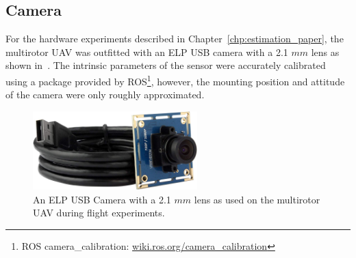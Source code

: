 \subsection{Camera}
For the hardware experiments described in Chapter~\ref{chp:estimation_paper},
the multirotor UAV was outfitted with an ELP USB camera with a 2.1 $mm$ lens as
shown in~. The intrinsic parameters of the sensor were
accurately calibrated using a package provided by ROS\footnote{ROS
camera\_calibration: \href{wiki.ros.org/camera_calibration}{wiki.ros.org/camera\_calibration}},
however, the mounting position and attitude of the camera were only roughly
approximated.

\begin{figure}[h]
  \centering
  \includegraphics[width=2.5in]{figures/camera.jpg}
  \caption[ELP USB Camera with 2.1 $mm$ Lens]{An ELP USB Camera with a 2.1 $mm$
  lens as used on the multirotor UAV during flight experiments.}
%
  \label{fig:camera}
\end{figure}

